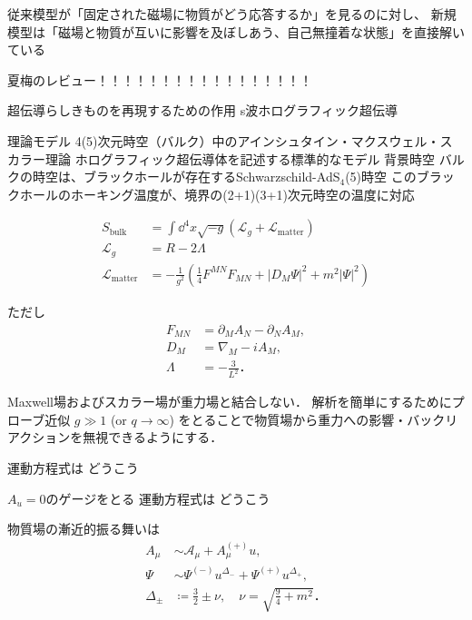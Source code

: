 \documentclass[b5paper,11pt,dvipdfmx]{jsarticle}
\numberwithin{equation}{section}
\theoremstyle{definition}
\begin{document}
従来模型が「固定された磁場に物質がどう応答するか」を見るのに対し、
新規模型は「磁場と物質が互いに影響を及ぼしあう、自己無撞着な状態」を直接解いている














夏梅のレビュー！！！！！！！！！！！！！！！！！

超伝導らしきものを再現するための作用
s波ホログラフィック超伝導

理論モデル
4(5)次元時空（バルク）中のアインシュタイン・マクスウェル・スカラー理論
ホログラフィック超伝導体を記述する標準的なモデル
背景時空
バルクの時空は、ブラックホールが存在するSchwarzschild-AdS$_4$(5)時空
このブラックホールのホーキング温度が、境界の(2+1)(3+1)次元時空の温度に対応

\begin{equation}
    \begin{split}
        S_{\text{bulk}}
        &= \int \dd^4 x \sqrt{-g} \left( \mathcal{L}_g + \mathcal{L}_{\text{matter}} \right)\\
        \mathcal{L}_{g}
        &= R - 2 \Lambda\\
        \mathcal{L}_{\text{matter}}
        &= - \frac{1}{g^2} \left( \frac{1}{4} F^{MN} F_{MN} + |D_M \Psi|^2 + m^2 |\Psi|^2 \right)
    \end{split}
\end{equation}

ただし
\begin{equation}
    \begin{split}
        F_{MN} &= \partial_M A_N - \partial_N A_M,\\
        D_M &= \nabla_M - i A_M,\\
        \Lambda &= - \frac{3}{L^2}．
    \end{split}
\end{equation}

Maxwell場およびスカラー場が重力場と結合しない．
解析を簡単にするためにプローブ近似
$g \gg 1$ (or $q \to \infty$)
をとることで物質場から重力への影響・バックリアクションを無視できるようにする．

運動方程式は
どうこう

$A_u = 0$のゲージをとる
運動方程式は
どうこう

物質場の漸近的振る舞いは
\begin{equation}
    \begin{split}
        A_\mu &\sim \mathcal{A}_\mu+A_\mu^{(+)} u,\\
        \Psi &\sim \Psi^{(-)} u^{\Delta_{-}}+\Psi^{(+)} u^{\Delta_{+}},\\
        \Delta_{\pm} &\coloneq \frac{3}{2} \pm \nu, \quad \nu = \sqrt{\frac{9}{4}+m^2}．
    \end{split}
\end{equation}
\end{document}
